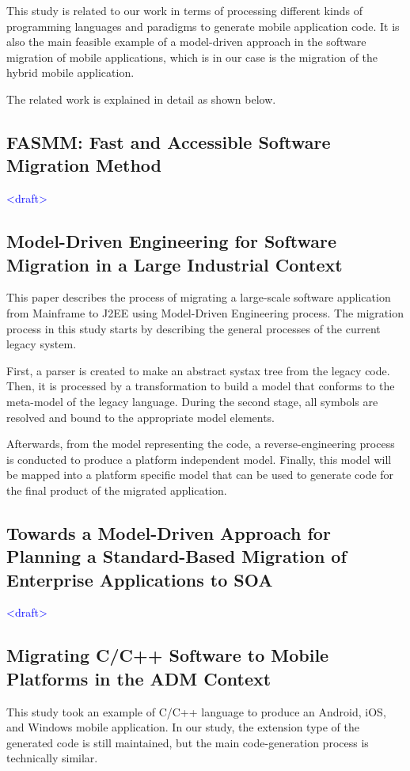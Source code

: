 \documentclass[conference]{IEEEtran}
\begin{document}
This \cite{b2} study is related to our work in terms of processing different kinds of 
programming languages and paradigms to generate mobile application code. It is also 
the main feasible example of a model-driven approach in the software migration of mobile applications,
which is in our case is the migration of the hybrid mobile application.

The related work is explained in detail as shown below. 

\subsection{ FASMM: Fast and Accessible Software Migration Method }
\textcolor{blue}{<draft>}

\subsection{ Model-Driven Engineering for Software Migration in a Large Industrial Context }
This paper describes the process of migrating a large-scale software application from Mainframe to J2EE
using Model-Driven Engineering process. The migration process in this study starts by describing the general 
processes of the current legacy system.

First, a parser is created to make an abstract systax tree from the legacy code. Then, it is processed
by a transformation to build a model that conforms to the meta-model of the legacy language.
During the second stage, all symbols are resolved and bound to the appropriate model elements.

Afterwards, from the model representing the code, a reverse-engineering process is conducted to produce a platform independent 
model. Finally, this model will be mapped into a platform specific model that can be used to generate code
for the final product of the migrated application. 

\subsection{ Towards a Model-Driven Approach for Planning a Standard-Based Migration of Enterprise Applications to SOA }
\textcolor{blue}{<draft>}

\subsection{ Migrating C/C++ Software to Mobile Platforms in the ADM Context }
This study took an example of C/C++ language to produce an Android, iOS, and Windows mobile application. 
In our study, the extension type of the generated code is still maintained,
but the main code-generation process is technically similar. 
\end{document}
